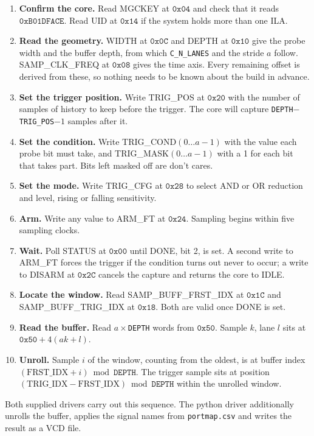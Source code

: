 \documentclass[twocolumn]{article}
\newcommand{\hex}[1]{\ensuremath{\mathtt{0x#1}}}
\begin{document}
\begin{enumerate}
    \item \textbf{Confirm the core.} Read MGCKEY at \hex{04} and check that it reads \hex{B01DFACE}. Read UID at \hex{14} if the system holds more than one \acs{ILA}.
    \item \textbf{Read the geometry.} WIDTH at \hex{0C} and DEPTH at \hex{10} give the probe width and the buffer depth, from which \texttt{C\_N\_LANES} and the stride $a$ follow. SAMP\_CLK\_FREQ at \hex{08} gives the time axis. Every remaining offset is derived from these, so nothing needs to be known about the build in advance.
    \item \textbf{Set the trigger position.} Write TRIG\_POS at \hex{20} with the number of samples of history to keep before the trigger. The core will capture \texttt{DEPTH}$-$\texttt{TRIG\_POS}$-1$ samples after it.
    \item \textbf{Set the condition.} Write TRIG\_COND$(0 \ldots a-1)$ with the value each probe bit must take, and TRIG\_MASK$(0 \ldots a-1)$ with a 1 for each bit that takes part. Bits left masked off are don't cares.
    \item \textbf{Set the mode.} Write TRIG\_CFG at \hex{28} to select AND or OR reduction and level, rising or falling sensitivity.
    \item \textbf{Arm.} Write any value to ARM\_FT at \hex{24}. Sampling begins within five sampling clocks.
    \item \textbf{Wait.} Poll STATUS at \hex{00} until DONE, bit 2, is set. A second write to ARM\_FT forces the trigger if the condition turns out never to occur; a write to DISARM at \hex{2C} cancels the capture and returns the core to IDLE.
    \item \textbf{Locate the window.} Read SAMP\_BUFF\_FRST\_IDX at \hex{1C} and SAMP\_BUFF\_TRIG\_IDX at \hex{18}. Both are valid once DONE is set.
    \item \textbf{Read the buffer.} Read $a \times$\texttt{DEPTH} words from \hex{50}. Sample $k$, lane $l$ sits at $\hex{50} + 4(ak + l)$.
    \item \textbf{Unroll.} Sample $i$ of the window, counting from the oldest, is at buffer index $(\mathrm{FRST\_IDX} + i) \bmod \mathtt{DEPTH}$. The trigger sample sits at position $(\mathrm{TRIG\_IDX} - \mathrm{FRST\_IDX}) \bmod \mathtt{DEPTH}$ within the unrolled window.
\end{enumerate}

Both supplied drivers carry out this sequence. The python driver additionally unrolls the buffer, applies the signal names from \texttt{portmap.csv} and writes the result as a \acs{VCD} file.
\end{document}
